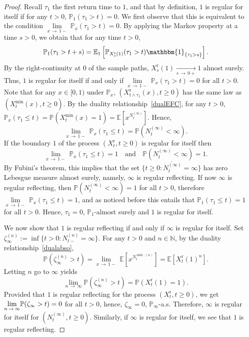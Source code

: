\documentclass[AHL,Unicode,longabstracts,published]{cedram}
\newcommand{\rmr}{\mathrm{r}}
\newcommand{\bbmun}{\mathbbm{1}}
\newcommand{\bbN}{\mathbb{N}}
\newcommand{\bbE}{\mathbb{E}}
\newcommand{\bbP}{\mathbb{P}}
\begin{document}
\begin{proof}
Recall $\tau_1$ the first return time to $1$, and that by definition, $1$ is regular for itself if for any $t>0$, $\bbP_1(\tau_1>t)=0$. We first observe that this is equivalent to the condition $\underset{x\,\rightarrow\,1-}{\lim}\ \bbP_x(\tau_1>t)=0$. By applying the Markov property at a time $s>0$, we obtain that for any time $t>0$,
\[
\bbP_1 (\tau_1>t+s)=\bbE_1\left[\bbP_{X^{\rmr}_s(1)}(\tau_1>t)\bbmun_{\left\{\tau_1>s\right\}}\right].
\]
By the right-continuity at $0$ of the sample paths, $X^{\rmr}_s(1)\underset{s\,\rightarrow\,0+}{\longrightarrow} 1$ almost surely. Thus, $1$ is regular for itself if and only if $\underset{x\,\rightarrow\,1-}{\lim}\ \bbP_x(\tau_1>t)=0$ for all $t>0$. Note that for any $x\in [0,1)$ under $\bbP_x$,
$(X^{\rmr}_{t\wedge \tau_1}(x),t\geq 0)$ has the same law as $(X_t^{\min}(x),t\geq 0)$. By the duality relationship~\eqref{dualEFC}, for any $t>0$, $\bbP_x(\tau_1\leq t)=\bbP(X_t^{\min}(x)=1)=\bbE[x^{N_t^{(\infty)}}].$ Hence, 
\[
\underset{x\,\rightarrow\,1-}{\lim} \ \bbP_x(\tau_1\leq t)=\bbP\left(N_t^{(\infty)}<\infty\right).
\]
If the boundary $1$ of the process $(X_t^{\rmr},t\geq 0)$ is regular for itself then 
\[
\underset{x\,\rightarrow\,1-}{\lim}\ \bbP_x(\tau_1\leq t)=1\quad\text{and}\quad\bbP\left(N_t^{(\infty)}<\infty\right)=1.
\]
By Fubini's theorem, this implies that the set $\overline{\{t\geq 0: N^{(\infty)}_t=\infty\}}$ has zero Lebesgue measure almost surely, namely, $\infty$ is regular reflecting. If now $\infty$ is regular reflecting, then $\bbP(N_t^{(\infty)}<\infty)=1$ for all $t>0$, therefore $\underset{x\,\rightarrow\,1-}{\lim}\ \bbP_x(\tau_1\leq t)=1$, and as noticed before this entails that $\bbP_1(\tau_1\leq t)=1$ for all $t>0$. Hence, $\tau_1=0$, $\bbP_1$-almost surely and $1$ is regular for itself.

We now show that $1$ is regular reflecting if and only if $\infty$ is regular for itself. Set $\zeta_\infty^{(n)}:=\inf\{t>0: N_{t-}^{(n)}=\infty\}$. For any $t>0$ and $n\in \bbN$, by the duality relationship~\eqref{dualabso}, 
\[
\bbP\left(\zeta_\infty^{(n)}>t\right)=\underset{x\,\rightarrow \,1-}{\lim}\ \bbE\left[x^{N_t^{\min,(n)}}\right]=\bbE\left[X_t^{\rmr}(1)^n\right].
\]
Letting $n$ go to $\infty$ yields
\[
\underset{n\,\rightarrow\,\infty}{\lim} \bbP(\zeta_\infty^{(n)}>t)=\bbP(X_t^{\rmr}(1)=1).
\]
Provided that $1$ is regular reflecting for the process $(X_t^{\rmr},t\geq 0)$, we get $\underset{n\,\rightarrow\,\infty}{\lim} \bbP(\zeta_\infty\linebreak > t)=0$ for all $t>0$, hence, $\zeta_\infty=0$, $\bbP_{\infty}$-a.s. Therefore, $\infty$ is regular for itself for $(N_t^{(\infty)},t\geq 0)$. Similarly, if $\infty$ is regular for itself, we see that $1$ is regular reflecting.
\end{proof}
\end{document}
